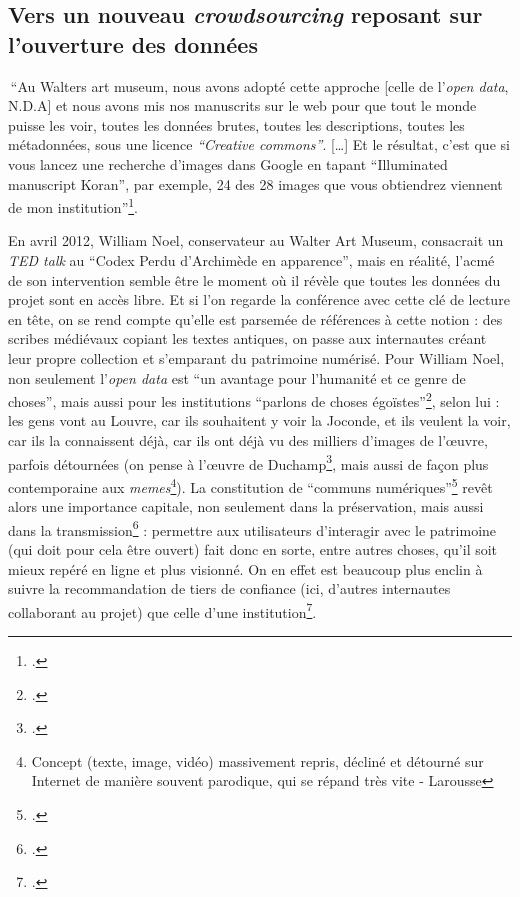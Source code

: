 \newpage

\subsection{Vers un nouveau \textit{crowdsourcing} reposant sur l'ouverture des données}


 \enquote{Au Walters art museum, nous avons adopté cette approche [celle de l’\textit{open data}, N.D.A] et nous avons mis nos manuscrits sur le web pour que tout le monde puisse les voir, toutes les données brutes, toutes les descriptions, toutes les métadonnées, sous une licence \textit{“Creative commons”}. […] Et le résultat, c’est que si vous lancez une recherche d’images dans Google en tapant “Illuminated manuscript Koran”, par exemple, 24 des 28 images que vous obtiendrez viennent de mon institution}\footcite{noel_william_nodate}.

En avril 2012, William Noel, conservateur au Walter Art Museum, consacrait un \textit{TED talk} au \enquote{Codex Perdu d’Archimède en apparence}, mais en réalité, l’acmé de son intervention semble être le moment où il révèle que toutes les données du projet sont en accès libre. Et si l’on regarde la conférence avec cette clé de lecture en tête, on se rend compte qu’elle est parsemée de références à cette notion : des scribes médiévaux copiant les textes antiques, on passe aux internautes créant leur propre collection et s’emparant du patrimoine numérisé. Pour William Noel, non seulement l’\textit{open data} est \enquote{un avantage pour l’humanité et ce genre de choses}, mais aussi pour les institutions \enquote{parlons de choses égoïstes}\footcite[à 13 minutes  26secondes]{noel_william_nodate}, selon lui : les gens vont au Louvre, car ils souhaitent y voir la Joconde, et ils veulent la voir, car ils la connaissent déjà, car ils ont déjà vu des milliers d’images de l’œuvre, parfois détournées (on pense à l’œuvre de Duchamp\footcite{zotero-368}, mais aussi de façon plus contemporaine aux \textit{memes}\footnote{Concept (texte, image, vidéo) massivement repris, décliné et détourné sur Internet de manière souvent parodique, qui se répand très vite - Larousse}). La constitution de \enquote{communs numériques}\footcite[p. 173]{bermes2024} revêt alors une importance capitale, non seulement dans la préservation, mais aussi dans la transmission\footcite[p. 175]{bermes2024} : permettre aux utilisateurs d’interagir avec le patrimoine (qui doit pour cela être ouvert) fait donc en sorte, entre autres choses, qu’il soit mieux repéré en ligne et plus visionné. On en effet est beaucoup plus enclin à suivre la recommandation de tiers de confiance (ici, d’autres internautes collaborant au projet) que celle d’une institution\footcite{ertzscheid2019}.

